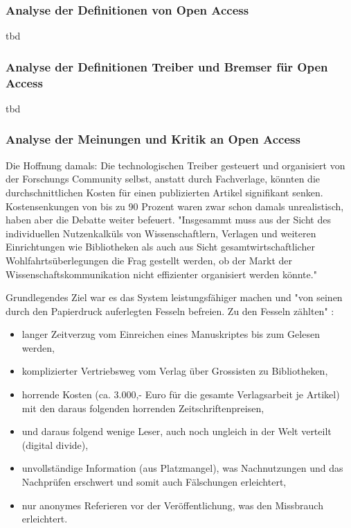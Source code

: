 \subsubsection{Analyse der Definitionen von Open Access} 
tbd

\subsubsection{Analyse der Definitionen Treiber und Bremser für Open Access} 
tbd

\subsubsection{Analyse der Meinungen und Kritik an Open Access}

Die Hoffnung damals: Die technologischen Treiber gesteuert und organisiert von der Forschungs Community selbst, anstatt durch Fachverlage, könnten die durchschnittlichen Kosten für einen publizierten Artikel signifikant senken. Kostensenkungen von bis zu 90 Prozent\cite{hilf_2004} waren zwar schon damals unrealistisch, haben aber die Debatte weiter befeuert. "Insgesammt muss aus der Sicht des individuellen Nutzenkalküls von Wissenschaftlern, Verlagen und weiteren Einrichtungen wie Bibliotheken als auch aus Sicht gesamtwirtschaftlicher Wohlfahrtsüberlegungen die Frag gestellt werden, ob der Markt der Wissenschaftskommunikation nicht effizienter organisiert werden könnte."\cite{Hess_2006}

Grundlegendes Ziel war es das System leistungsfähiger machen und "von seinen durch den Papierdruck auferlegten Fesseln befreien. Zu den Fesseln zählten" \cite{hilf_2004}:
\begin{itemize}
\item langer Zeitverzug vom Einreichen eines Manuskriptes bis zum Gelesen werden,
\item komplizierter Vertriebsweg vom Verlag über Grossisten zu Bibliotheken,
\item horrende Kosten (ca. 3.000,- Euro für die gesamte Verlagsarbeit je Artikel) mit den daraus folgenden horrenden Zeitschriftenpreisen,
\item und daraus folgend wenige Leser, auch noch ungleich in der Welt verteilt (digital divide),
\item unvollständige Information (aus Platzmangel), was Nachnutzungen und das Nachprüfen erschwert und somit auch Fälschungen erleichtert,
\item nur anonymes Referieren vor der Veröffentlichung, was den Missbrauch erleichtert. 
\end{itemize}

